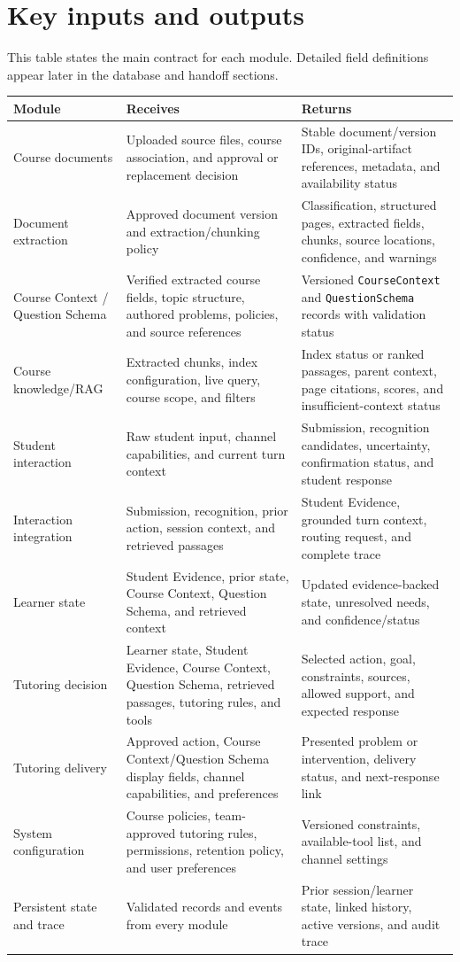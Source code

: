 \documentclass[11pt]{article}
\begin{document}
\section{Key inputs and outputs}

This table states the main contract for each module. Detailed field definitions appear later in the database and handoff sections.

\small
\noindent\begin{tabularx}{\textwidth}{@{}p{}p{}X@{}}
\toprule
\textbf{Module} & \textbf{Receives} & \textbf{Returns} \\
\midrule
Course documents & Uploaded source files, course association, and approval or replacement decision & Stable document/version IDs, original-artifact references, metadata, and availability status \\
Document extraction & Approved document version and extraction/chunking policy & Classification, structured pages, extracted fields, chunks, source locations, confidence, and warnings \\
Course Context / Question Schema & Verified extracted course fields, topic structure, authored problems, policies, and source references & Versioned \texttt{CourseContext} and \texttt{QuestionSchema} records with validation status \\
Course knowledge/RAG & Extracted chunks, index configuration, live query, course scope, and filters & Index status or ranked passages, parent context, page citations, scores, and insufficient-context status \\
Student interaction & Raw student input, channel capabilities, and current turn context & Submission, recognition candidates, uncertainty, confirmation status, and student response \\
Interaction integration & Submission, recognition, prior action, session context, and retrieved passages & Student Evidence, grounded turn context, routing request, and complete trace \\
Learner state & Student Evidence, prior state, Course Context, Question Schema, and retrieved context & Updated evidence-backed state, unresolved needs, and confidence/status \\
Tutoring decision & Learner state, Student Evidence, Course Context, Question Schema, retrieved passages, tutoring rules, and tools & Selected action, goal, constraints, sources, allowed support, and expected response \\
Tutoring delivery & Approved action, Course Context/Question Schema display fields, channel capabilities, and preferences & Presented problem or intervention, delivery status, and next-response link \\
System configuration & Course policies, team-approved tutoring rules, permissions, retention policy, and user preferences & Versioned constraints, available-tool list, and channel settings \\
Persistent state and trace & Validated records and events from every module & Prior session/learner state, linked history, active versions, and audit trace \\
\bottomrule
\end{tabularx}
\normalsize
\newpage
\end{document}
